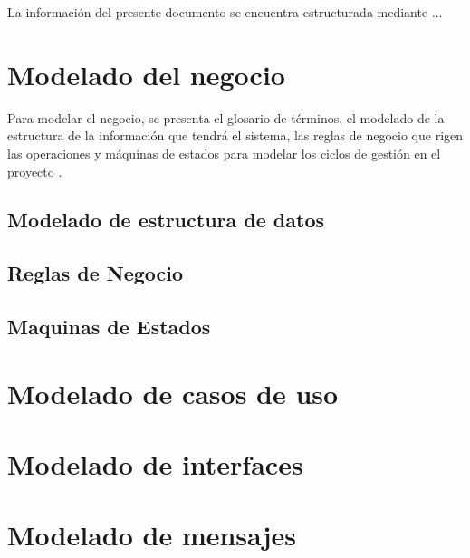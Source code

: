    	La información del presente documento se encuentra estructurada mediante ...

    \section{Modelado del negocio}
    

        Para modelar el negocio, se presenta el glosario de términos, el modelado de la estructura de la información que tendrá el sistema, las reglas de negocio que rigen las operaciones y máquinas de estados para modelar los ciclos de gestión en el proyecto \varProyecto.
        

        \subsection{Modelado de estructura de datos}
        \label{sec:ModEstructuraDatos}
        
        \subsection{Reglas de Negocio}
        \label{sec:ModReglasNegocio}
        
        \subsection{Maquinas de Estados}
        \label{sec:ModMaquinas}
    
    \clearpage
    \section{Modelado de casos de uso}
    \section{Modelado de interfaces}
    \section{Modelado de mensajes}
    
    
